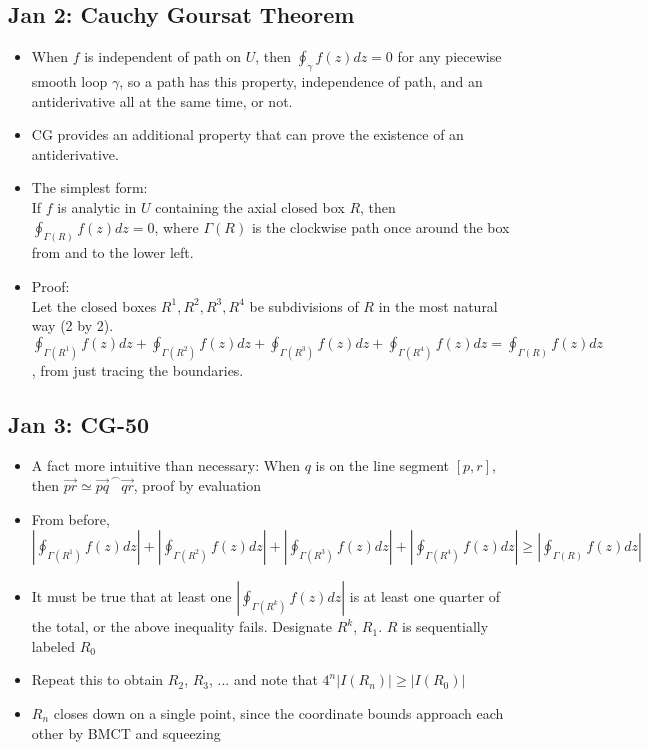 \documentclass[10pt, oneside]{article}
\newcommand{\cat}{^{\,\smallfrown}}
\let\geq\geqslant
\begin{document}
\subsection{Jan 2: Cauchy Goursat Theorem}
\begin{itemize}
    \item When $f$ is independent of path on $U$, then $\oint_{\gamma} f(z) dz = 0$ for any piecewise smooth loop $\gamma$, so a path has this property, independence of path, and an antiderivative all at the same time, or not.
    \item CG provides an additional property that can prove the existence of an antiderivative.
    \item The simplest form:\\
        If $f$ is analytic in $U$ containing the axial closed box $R$, then $\oint_{\Gamma(R)} f(z) dz = 0$, where $\Gamma(R)$ is the clockwise path once around the box from and to the lower left.
    \item Proof:\\
        Let the closed boxes $R^1, R^2, R^3, R^4$ be subdivisions of $R$ in the most natural way (2 by 2). $\oint_{\Gamma(R^1)} f(z) dz + \oint_{\Gamma(R^2)} f(z) dz + \oint_{\Gamma(R^3)} f(z) dz + \oint_{\Gamma(R^4)} f(z) dz = \oint_{\Gamma(R)} f(z) dz$, from just tracing the boundaries.
\end{itemize}

\subsection{Jan 3: CG-50}
\begin{itemize}
    \item A fact more intuitive than necessary: When $q$ is on the line segment $[p,r]$, then $\overrightarrow{pr} \simeq \overrightarrow{pq} \cat \overrightarrow{qr}$, proof by evaluation
    \item From before, $|\oint_{\Gamma(R^1)} f(z) dz| + |\oint_{\Gamma(R^2)} f(z) dz| + |\oint_{\Gamma(R^3)} f(z) dz| + |\oint_{\Gamma(R^4)} f(z) dz| \geq |\oint_{\Gamma(R)} f(z) dz|$
    \item It must be true that at least one $|\oint_{\Gamma(R^k)} f(z) dz|$ is at least one quarter of the total, or the above inequality fails. Designate $R^k$, $R_1$. $R$ is sequentially labeled $R_0$
    \item Repeat this to obtain $R_2$, $R_3$, ... and note that $4^n |I(R_n)| \geq |I(R_0)|$
    \item $R_n$ closes down on a single point, since the coordinate bounds approach each other by BMCT and squeezing
\end{itemize}
\end{document}
